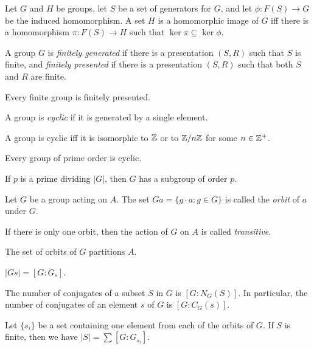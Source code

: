 \begin{prop}
    Let $G$ and $H$ be groups, let $S$ be a set of generators for $G$, and let
    $\phi:F(S)\to G$ be the induced homomorphism. A set $H$ is a homomorphic
    image of $G$ iff there is a homomorphism $\pi:F(S)\to H$ such that
    $\ker\pi\subseteq\ker\phi$.
\end{prop}
\begin{defn}
    A group $G$ is \emph{finitely generated} if there is a presentation $(S,R)$
    such that $S$ is finite, and \emph{finitely presented} if there is a
    presentation $(S,R)$ such that both $S$ and $R$ are finite.
\end{defn}
\begin{prop}
    Every finite group is finitely presented.
\end{prop}
\begin{defn}
    A group is \emph{cyclic} if it is generated by a single element.
\end{defn}
\begin{prop}
    A group is cyclic iff it is isomorphic to $\mathbb{Z}$ or to $\mathbb{Z}/n\mathbb{Z}$ for some
    $n\in\mathbb{Z}^+$.
\end{prop}
\begin{prop}
    Every group of prime order is cyclic.
\end{prop}
\begin{thm}[Cauchy]
    If $p$ is a prime dividing $|G|$, then $G$ has a subgroup of order $p$.
\end{thm}
\begin{defn}
    Let $G$ be a group acting on $A$.
    The set $Ga=\{g\cdot a:g\in G\}$ is called the \emph{orbit} of $a$ under $G$.

    If there is only one orbit, then the action of $G$ on $A$ is called
    \emph{transitive}.
\end{defn}
\begin{prop}
    The set of orbits of $G$ partitions $A$.
\end{prop}
\begin{prop}
    $|Gs|=[G:G_s]$.
\end{prop}
\begin{cor}
    The number of conjugates of a subset $S$ in $G$ is $[G:N_G(S)]$. In
    particular, the number of conjugates of an element $s$ of $G$ is
    $[G:C_G(s)]$.
\end{cor}
\begin{cor}
    Let $\{s_i\}$ be a set containing one element from each of the orbits of
    $G$. If $S$ is finite, then we have
    $|S|=\sum[G:G_{s_i}]$.
\end{cor}
